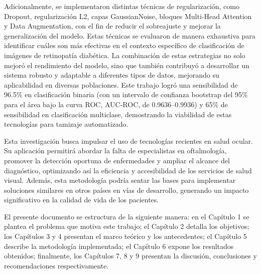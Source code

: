 Adicionalmente, se implementaron distintas técnicas de regularización, como Dropout,
regularización L2, capas GaussianNoise, bloques Multi-Head Attention y Data Augmentation,
con el fin de reducir el sobreajuste y mejorar la generalización del modelo. Estas técnicas
se evaluaron de manera exhaustiva para identificar cuáles son más efectivas en el contexto
específico de clasificación de imágenes de retinopatía diabética. La combinación de estas
estrategias no solo mejoró el rendimiento del modelo, sino que también contribuyó a
desarrollar un sistema robusto y adaptable a diferentes tipos de datos, mejorando su
aplicabilidad en diversas poblaciones. Este trabajo logró una sensibilidad de 96.5\%
en clasificación binaria (con un intervalo de confianza bootstrap del 95\% para el área bajo la curva ROC, AUC-ROC, de 0.9636–0.9936)
y 65\% de sensibilidad en clasificación multiclase, demostrando la viabilidad de estas
tecnologías para tamizaje automatizado.

Esta investigación busca impulsar el uso de tecnologías recientes en salud ocular. Su
aplicación permitirá abordar la falta de especialistas en oftalmología, promover la
detección oportuna de enfermedades y ampliar el alcance del diagnóstico, optimizando
así la eficiencia y accesibilidad de los servicios de salud visual. Además, esta
metodología podría sentar las bases para implementar soluciones similares en otros países
en vías de desarrollo, generando un impacto significativo en la calidad de vida de los
pacientes.

El presente documento se estructura de la siguiente manera: en el Capítulo 1 se plantea
el problema que motiva este trabajo; el Capítulo 2 detalla los objetivos; los Capítulos 3
y 4 presentan el marco teórico y los antecedentes; el Capítulo 5 describe la metodología
implementada; el Capítulo 6 expone los resultados obtenidos; finalmente, los Capítulos 7,
8 y 9 presentan la discusión, conclusiones y recomendaciones respectivamente.

